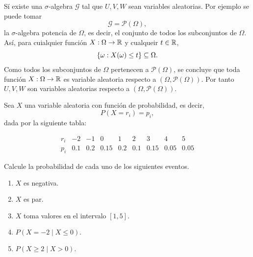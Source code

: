 \documentclass[12pt,a4paper]{article}
\begin{document}
\begin{solucion}
        Sí existe una $\sigma$-algebra $\mathcal{G}$ tal que $U,V,W$ sean variables aleatorias. Por ejemplo
        se puede tomar
        \begin{equation*}
            \mathcal{G}=\mathcal{P}(\Omega),
        \end{equation*}
        la $\sigma$-algebra potencia de $\Omega$, es decir, el conjunto de todos los subconjuntos de $\Omega$.
        Así, para cuialquier función $X:\Omega\to\mathbb{R}$ y cualqueir $t\in\mathbb{R}$,
        \begin{equation*}
            \{\omega:X(\omega)\leq t\}\subseteq\Omega.
        \end{equation*}
        Como todos los subconjuntos de $\Omega$ pertenecen a $\mathcal{P}(\Omega)$, se concluye que toda función
        $X:\Omega\to\mathbb{R}$ es variable aleatoria respecto a $(\Omega,\mathcal{P}(\Omega))$. Por tanto $U,V,W$ son
        variables aleatorias respecto a $(\Omega,\mathcal{P}(\Omega))$.
    \end{solucion}

    \begin{mdframed}[style=mdpinkbox,frametitle={Ejercicio 5}]
    Sea $X$ una variable aleatoria con función de probabilidad, es decir,
    \[
    P(X=r_{i})=p_{i},
    \]
    dada por la siguiente tabla:

    \[
    \begin{array}{c|cccccccc}
        r_{i} & -2 & -1 & 0 & 1 & 2 & 3 & 4 & 5\\
        \hline
        p_{i} & 0.1 & 0.2 & 0.15 & 0.2 & 0.1 & 0.15 & 0.05 & 0.05
    \end{array}
    \]

    Calcule la probabilidad de cada uno de los siguientes eventos.

        \begin{enumerate}
            \item[(a)] $X$ es negativa.
            \item[(b)] $X$ es par.
            \item[(c)] $X$ toma valores en el intervalo $[1,5]$.
            \item[(d)] $P(X=-2\mid X\leq 0)$.
            \item[(e)] $P(X\geq 2\mid X>0)$.
        \end{enumerate}
    \end{mdframed}
\end{document}
